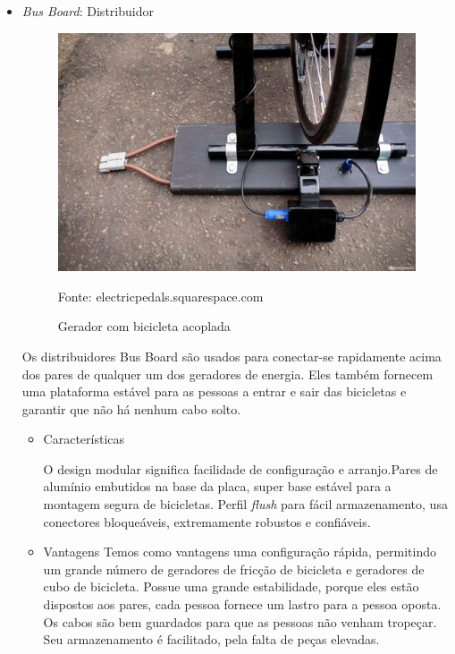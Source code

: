 \pagebreak
\begin{itemize}
	\item \textit{Bus Board}: Distribuidor
	
	\begin{figure}[H]
	 \centering
	\label{Bus Board: Distribuidor}
	 \includegraphics[keepaspectratio=true,scale=0.8]{interacao/11.png}
	 \caption{Gerador com bicicleta acoplada}
	 \small{Fonte: electricpedals.squarespace.com}
	\end{figure}
	
Os distribuidores Bus Board são usados para conectar-se rapidamente acima dos pares de qualquer um dos geradores de energia. Eles também fornecem uma plataforma estável para as pessoas a entrar e sair das bicicletas e garantir que não há nenhum cabo solto.

	\begin{itemize}

	\item Características
	
	O design modular significa facilidade de configuração e arranjo.Pares de alumínio embutidos na base da placa, super base estável para a montagem segura de bicicletas. Perfil \textit{flush} para fácil armazenamento, usa conectores bloqueáveis, extremamente robustos e confiáveis.				
	\end{itemize}	
			
	\begin{itemize}
	\item Vantagens
		Temos como vantagens uma configuração rápida, permitindo um grande número de geradores de fricção de bicicleta e geradores de cubo de bicicleta. Possue uma grande estabilidade, porque eles estão dispostos aos pares, cada pessoa fornece um lastro para a pessoa oposta. Os cabos são bem guardados para que as pessoas não venham tropeçar. Seu armazenamento é facilitado, pela falta de peças elevadas.	
	\end{itemize}		


\end{itemize}
